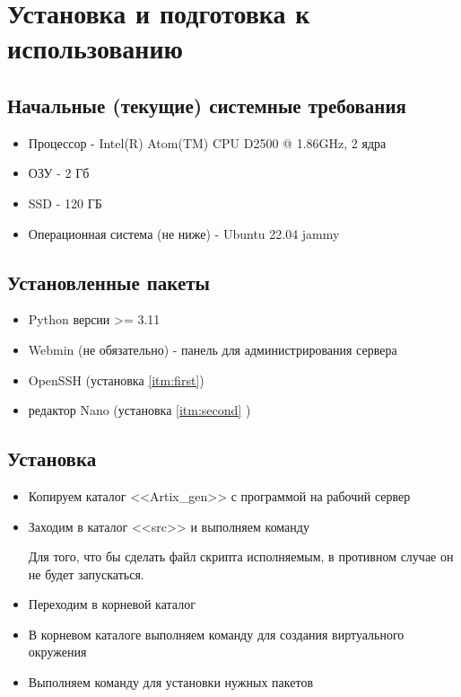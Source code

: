 \section{Установка и подготовка к использованию}
\subsection{Начальные (текущие) системные требования}

\begin{itemize}[label=$\ast$]
	\item	Процессор - Intel(R) Atom(TM) CPU D2500 @ 1.86GHz, 2 ядра
	\item	ОЗУ - 2 Гб 
	\item	SSD - 120 ГБ
	\item	Операционная система (не ниже)  - Ubuntu 22.04 jammy
\end{itemize}	


\subsection{Установленные пакеты}

\begin{itemize}[label=$\ast$]
	\item	Python версии >= 3.11
	\item	Webmin (не обязательно) - панель для администрирования сервера 
	\item	OpenSSH (установка \ref{itm:first})
	\item	редактор Nano (установка \ref{itm:second} )
\end{itemize}	




\subsection{Установка}

\begin{itemize}
	\item Копируем каталог <<Artix\_gen>> с программой на рабочий сервер
	\item  Заходим в каталог <<src>> и выполняем команду
	
	

	
	Для того, что бы сделать файл скрипта исполняемым, в противном случае он не будет запускаться.  

	\item Переходим в корневой каталог
	
 
	\item В корневом каталоге выполняем команду для создания виртуального окружения
	

   
	\item  Выполняем команду для установки нужных пакетов
	
	
\end{itemize}
